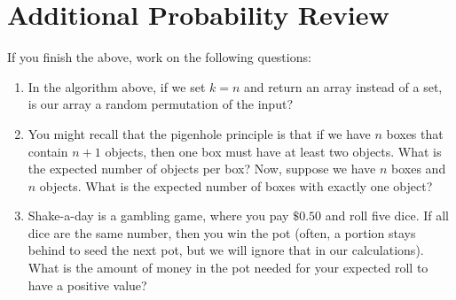 \documentclass{article}
\begin{document}
\section*{Additional Probability Review}
If you finish the above, work on the following questions:
\begin{enumerate}
    \item In the algorithm above, if we set $k=n$ and return an array instead of
        a set, is our
        array a random permutation of the input?
    \item You might recall that the pigenhole principle is that if we have $n$
        boxes that contain $n+1$ objects, then one box must have at least two
        objects.  What is the expected number of objects per box?  Now, suppose
        we have $n$ boxes and $n$ objects.  What is the
        expected number of boxes with exactly one object?
    \item Shake-a-day is a gambling game, where you pay $\$0.50$ and roll five
        dice.  If all dice are the same number, then you win the pot (often, a
        portion stays behind to seed the next pot, but we will ignore that in
        our calculations).  What is the amount of money in the pot needed for
        your expected roll to have a positive value?
\end{enumerate}
\end{document}
